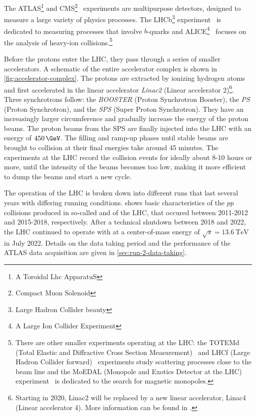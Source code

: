 The ATLAS\footnote{A Toroidal Lhc ApparatuS} and CMS\footnote{Compact Muon Solenoid}~\cite{CMS-TDR-08-001} experiments are multipurpose detectors, designed to measure a large variety of physics processes. The LHCb\footnote{Large Hadron Collider beauty} experiment~\cite{1748-0221-3-08-S08005} is dedicated to measuring processes that involve $b$-quarks and ALICE\footnote{A Large Ion Collider Experiment}~\cite{1748-0221-3-08-S08002} focuses on the analysis of heavy-ion collisions.\footnote{There are other smaller experiments operating at the LHC: the TOTEMd (Total Elastic and Diffractive Cross Section Measurement)~\cite{1748-0221-3-08-S08007} and LHCf (Large Hadron Collider forward)~\cite{1748-0221-3-08-S08006} experiments study scattering processes close to the beam line and the MoEDAL (Monopole and Exotics Detector at the LHC) experiment~\cite{1742-6596-631-1-012014} is dedicated to the search for magnetic monopoles.}

Before the protons enter the LHC, they pass through a series of smaller accelerators. A schematic of the entire accelerator complex is shown in \cref{fig:accelerator-complex}.
The protons are extracted by ionizing hydrogen atoms and first accelerated in the linear accelerator \emph{Linac2} (Linear accelerator 2)\footnote{Starting in 2020, Linac2 will be replaced by a new linear accelerator, Linac4 (Linear accelerator 4). More information can be found in .}. Three synchrotrons follow: the \emph{BOOSTER} (Proton Synchrotron Booster), the \emph{PS} (Proton Synchrotron), and the \emph{SPS} (Super Proton Synchrotron).
They have an increasingly larger circumference and gradually increase the energy of the proton beams.
The proton beams from the SPS are finally injected into the LHC with an energy of $450\,\GeV$. The filling and ramp-up phases until stable beams are brought to collision at their final energies take around 45 minutes. The experiments at the LHC record the collision events for ideally about 8-10 hours or more, until the intensity of the beams becomes too low, making it more efficient to dump the beams and start a new cycle.

The operation of the LHC is broken down into different runs that last several years with differing running conditions.
 shows basic characteristics of the $pp$ collisions produced in so-called \RunOne and \RunTwo of the LHC, that occured between 2011-2012 and 2015-2018, respectively. After a technical shutdown between 2018 and 2022, the LHC continued to operate with \RunThr at a center-of-mass energy of $\sqrt{s} = \SI{13.6}{\TeV}$ in July 2022.
Details on the \RunTwo data taking period and the performance of the ATLAS data acquisition are given in \cref{sec:run-2-data-taking}.

